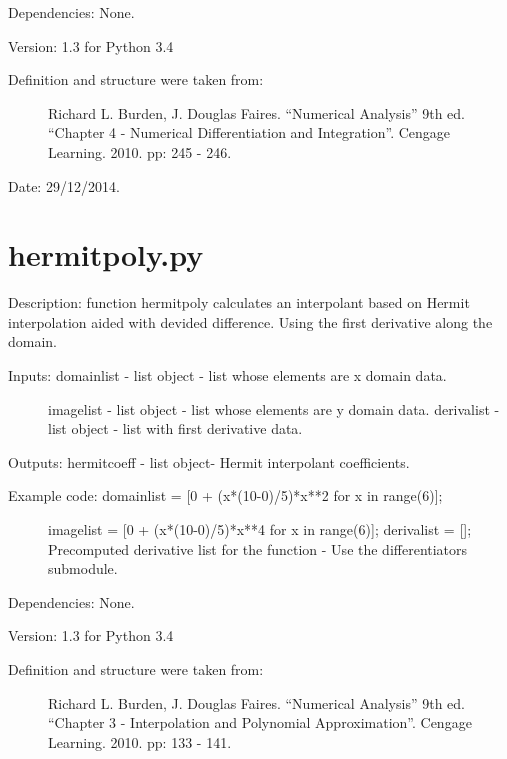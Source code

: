 \documentclass[letterpaper,10pt,oneside]{sphinxmanual}
\theoremstyle{plain}%
\theoremstyle{definition}%
\theoremstyle{remark}%
\begin{document}
Dependencies: None.

Version: 1.3 for Python 3.4
\begin{description}
\item[{Definition and structure were taken from:}] \leavevmode
Richard L. Burden, J. Douglas Faires. ``Numerical Analysis'' 9th ed.
``Chapter 4 - Numerical Differentiation and Integration''. 
Cengage Learning. 2010. pp: 245 - 246.

\end{description}




Date: 29/12/2014.


\section{hermitpoly.py}
\label{code:hermitpoly-py}\label{code:module-hermitpoly}
Description: function hermitpoly calculates an interpolant based on Hermit
interpolation aided with devided difference. Using the first derivative 
along the domain.
\begin{description}
\item[{Inputs: domainlist - list object - list whose elements are x domain data.}] \leavevmode
imagelist - list object - list whose elements are y domain data.
derivalist - list object - list with first derivative data.

\end{description}

Outputs: hermitcoeff - list object- Hermit interpolant coefficients.
\begin{description}
\item[{Example code: domainlist = {[}0 + (x*(10-0)/5)*x**2 for x in range(6){]};}] \leavevmode
imagelist = {[}0 + (x*(10-0)/5)*x**4 for x in range(6){]};
derivalist = {[}{]}; Precomputed derivative list for the function - Use the differentiators submodule.

\end{description}

Dependencies: None.

Version: 1.3 for Python 3.4
\begin{description}
\item[{Definition and structure were taken from:}] \leavevmode
Richard L. Burden, J. Douglas Faires. ``Numerical Analysis'' 9th ed.
``Chapter 3 - Interpolation and Polynomial Approximation''. 
Cengage Learning. 2010. pp: 133 - 141.

\end{description}
\end{document}
